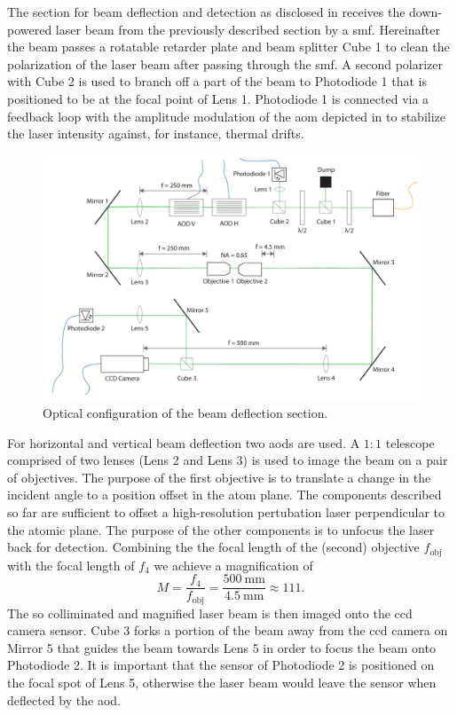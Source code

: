 The section for beam deflection and detection as disclosed in
 receives the down-powered laser beam from
the previously described section by a \gls{smf}. Hereinafter the beam passes
a rotatable retarder plate and beam splitter Cube \num{1} to clean the
polarization of the laser beam after passing through the \gls{smf}. A second
polarizer with Cube \num{2} is used to branch off a part of the beam to
Photodiode \num{1} that is positioned to be at the focal point of Lens
\num{1}. Photodiode \num{1} is connected via a feedback loop with the
amplitude modulation of the \gls{aom} depicted in
 to stabilize the laser intensity against, for
instance, thermal drifts.
\begin{figure}[htb]
  \centering
  \includegraphics[width=\textwidth]{../figure/setup/beam-deflection.pdf}
  \caption{Optical configuration of the beam deflection section.
  }\label{fig:setup_beam_deflection}
\end{figure}
For horizontal and vertical beam deflection two \gls{aod}s are used. A $1:1$
telescope comprised of two lenses (Lens \num{2} and Lens \num{3}) is used to
image the beam on a pair of objectives. The purpose of the first objective is
to translate a change in the incident angle to a position offset in the atom
plane. The components described so far are sufficient to offset a
high-resolution pertubation laser perpendicular to the atomic plane. The
purpose of the other components is to unfocus the laser back for detection.
Combining the the focal length of the (second) objective $f_\text{obj}$ with
the focal length of $f_4$ we achieve a magnification of
\begin{equation}
  M
  =\frac{f_4}{f_\text{obj}}
  =\frac{\SI{500}{\milli\meter}}{\SI{4.5}{\milli\meter}}
  \approx 111
  \label{eq:setup_magnification}.
\end{equation}
The so colliminated and magnified laser beam is then imaged onto the \gls{ccd}
camera sensor. Cube \num{3} forks a portion of the beam away from the
\gls{ccd} camera on Mirror \num{5} that guides the beam towards Lens
\num{5} in order to focus the beam onto Photodiode \num{2}. It is important
that the sensor of Photodiode \num{2} is positioned on the focal spot of
Lens \num{5}, otherwise the laser beam would leave the sensor when deflected
by the \gls{aod}.

